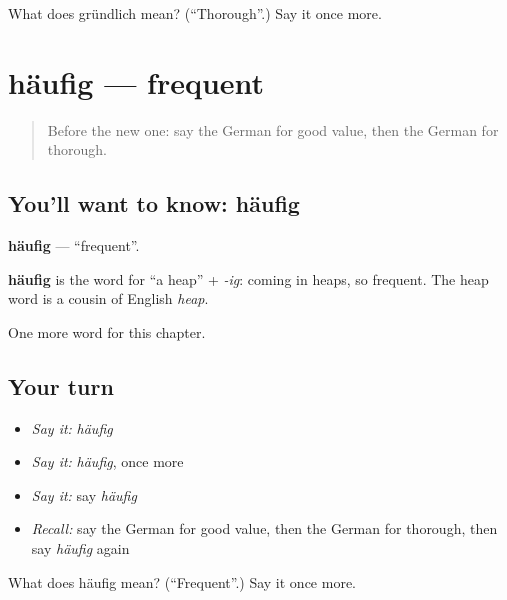 \begin{tcolorbox}[breakable,colback=teal!4,colframe=teal!35!black,title={Before you move on}]
What does gründlich mean? (\textquotedblleft{}Thorough\textquotedblright{}.) Say it once more.
\end{tcolorbox}
\section[häufig]{häufig — frequent}

\label{lesson:GE-C216-haeufig}



\begin{quote}
Before the new one: say the German for good value, then the German for thorough.
\end{quote}

\subsection*{You'll want to know: häufig}
\textbf{häufig} — \textquotedblleft{}frequent\textquotedblright{}.

\begin{cousinweb}
\textbf{häufig} is the word for \textquotedblleft{}a heap\textquotedblright{} + \emph{-ig}: coming in heaps, so frequent. The heap word is a cousin of English \emph{heap}.
\end{cousinweb}

\begin{grammarlens}[title={What you've built}]
One more word for this chapter.
\end{grammarlens}

\subsection*{Your turn}
\begin{itemize}
\raggedright
  \item \emph{Say it:} \emph{häufig}
  \item \emph{Say it:} \emph{häufig}, once more
  \item \emph{Say it:} say \emph{häufig}
  \item \emph{Recall:} say the German for good value, then the German for thorough, then say \emph{häufig} again
\end{itemize}

\begin{tcolorbox}[breakable,colback=teal!4,colframe=teal!35!black,title={Before you move on}]
What does häufig mean? (\textquotedblleft{}Frequent\textquotedblright{}.) Say it once more.
\end{tcolorbox}
